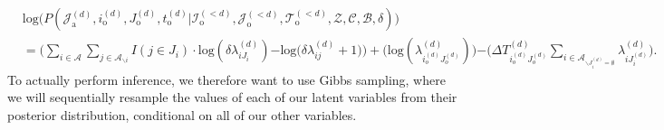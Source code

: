 \documentclass[a4paper]{article}
\begin{document}
 \begin{equation}
 \begin{aligned}
 &\mbox{log}\Big(P(\mathcal{J}^{(d)}_{\mbox{a}}, i^{(d)}_{\mbox{o}}, J^{(d)}_{\mbox{o}}, t^{(d)}_{\mbox{o}} |\mathcal{I}^{(<d)}_{\mbox{o}}, \mathcal{J}^{(<d)}_{\mbox{o}}, \mathcal{T}^{(<d)}_{\mbox{o}}, \mathcal{Z}, \mathcal{C}, \mathcal{B},  \delta)\Big)\\&=\Big(\sum_{i\in \mathcal{A}}\sum_{j \in \mathcal{A}_{\backslash i }} {I(j \in J_i)}\cdot\mbox{log}(\delta\lambda^{(d)}_{iJ_i}) {-\mbox{log}(\delta\lambda^{(d)}_{ij}}+1)\Big)+ \Big(\mbox{log}(\lambda^{(d)}_{i_o^{(d)}J_o^{(d)}})\Big) {-\Big(\Delta T^{(d)}_{i_o^{(d)}J_o^{(d)}}\sum\limits_{i \in \mathcal{A}_{\backslash J_i^{(d)}=\emptyset}}\lambda^{(d)}_{i{J_i^{(d)}}}\Big)}.
 \end{aligned}
 \end{equation}
 To actually perform inference, we therefore want to use Gibbs sampling, where we will sequentially resample the values of each of our latent variables from their posterior distribution, conditional on all of our other variables.
\end{document}
